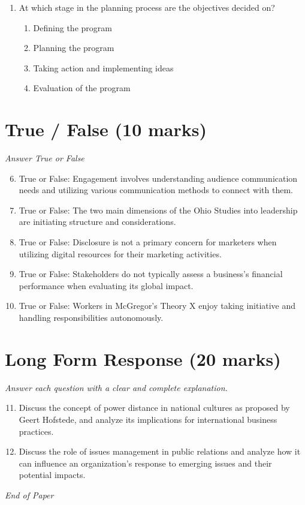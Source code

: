\documentclass[12pt]{article}
\begin{document}
\begin{enumerate}[label=\arabic*.]
\begin{enumerate}[label=(\alph*)]
    \item Line management
    \item Supplier
\end{enumerate}
\item At which stage in the planning process are the objectives decided on?
\begin{enumerate}[label=(\alph*)]
    \item Defining the program
    \item Planning the program
    \item Taking action and implementing ideas
    \item Evaluation of the program
\end{enumerate}
\end{enumerate}

\section*{True / False (10 marks)}
\textit{Answer True or False}
\begin{enumerate}[label=\arabic*.]
\setcounter{enumi}{5}
\item True or False: Engagement involves understanding audience communication needs and utilizing various communication methods to connect with them.
\item True or False: The two main dimensions of the Ohio Studies into leadership are initiating structure and considerations.
\item True or False: Disclosure is not a primary concern for marketers when utilizing digital resources for their marketing activities.
\item True or False: Stakeholders do not typically assess a business's financial performance when evaluating its global impact.
\item True or False: Workers in McGregor's Theory X enjoy taking initiative and handling responsibilities autonomously.
\end{enumerate}

\section*{Long Form Response (20 marks)}
\textit{Answer each question with a clear and complete explanation.}
\begin{enumerate}[label=\arabic*.]
\setcounter{enumi}{10}
\item Discuss the concept of power distance in national cultures as proposed by Geert Hofstede, and analyze its implications for international business practices.
\item Discuss the role of issues management in public relations and analyze how it can influence an organization's response to emerging issues and their potential impacts.
\end{enumerate}

\vfill
\noindent\textit{End of Paper}
\end{document}
